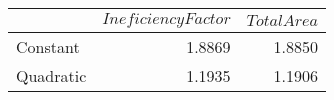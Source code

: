 \begin{tabular}{lrr}
\toprule
{} &  $Ineficiency Factor$ &  $TotalArea$ \\
\midrule
Constant  &                1.8869 &       1.8850 \\
Quadratic &                1.1935 &       1.1906 \\
\bottomrule
\end{tabular}
